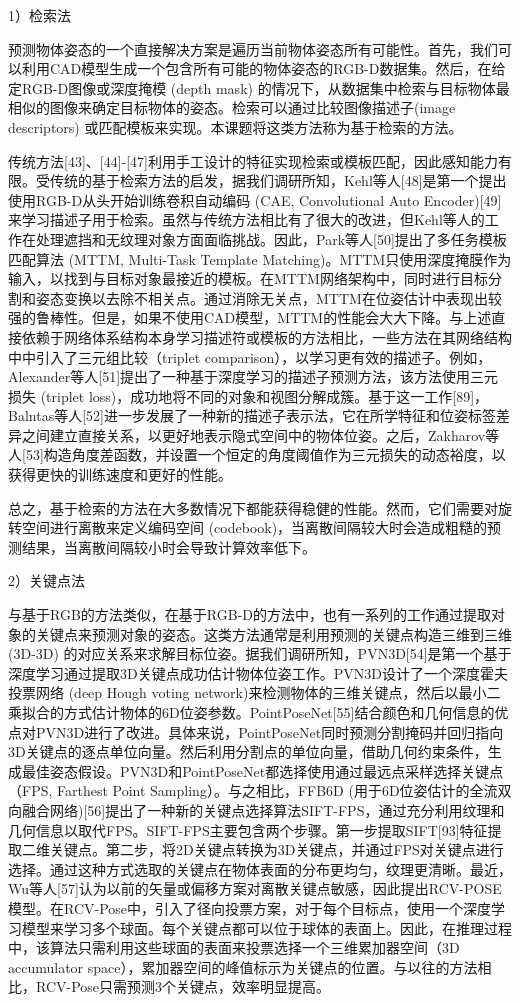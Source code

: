 \documentclass[12pt]{article}
\begin{document}
1）检索法

预测物体姿态的一个直接解决方案是遍历当前物体姿态所有可能性。首先，我们可以利用CAD模型生成一个包含所有可能的物体姿态的RGB-D数据集。然后，在给定RGB-D图像或深度掩模 (depth mask) 的情况下，从数据集中检索与目标物体最相似的图像来确定目标物体的姿态。检索可以通过比较图像描述子(image descriptors) 或匹配模板来实现。本课题将这类方法称为基于检索的方法。

传统方法[43]、[44]-[47]利用手工设计的特征实现检索或模板匹配，因此感知能力有限。受传统的基于检索方法的启发，据我们调研所知，Kehl等人[48]是第一个提出使用RGB-D从头开始训练卷积自动编码 (CAE, Convolutional Auto Encoder)[49]来学习描述子用于检索。虽然与传统方法相比有了很大的改进，但Kehl等人的工作在处理遮挡和无纹理对象方面面临挑战。因此，Park等人[50]提出了多任务模板匹配算法 (MTTM, Multi-Task Template Matching)。MTTM只使用深度掩膜作为输入，以找到与目标对象最接近的模板。在MTTM网络架构中，同时进行目标分割和姿态变换以去除不相关点。通过消除无关点，MTTM在位姿估计中表现出较强的鲁棒性。但是，如果不使用CAD模型，MTTM的性能会大大下降。与上述直接依赖于网络体系结构本身学习描述符或模板的方法相比，一些方法在其网络结构中中引入了三元组比较（triplet comparison），以学习更有效的描述子。例如，Alexander等人[51]提出了一种基于深度学习的描述子预测方法，该方法使用三元损失 (triplet loss)，成功地将不同的对象和视图分解成簇。基于这一工作[89]，Balntas等人[52]进一步发展了一种新的描述子表示法，它在所学特征和位姿标签差异之间建立直接关系，以更好地表示隐式空间中的物体位姿。之后，Zakharov等人[53]构造角度差函数，并设置一个恒定的角度阈值作为三元损失的动态裕度，以获得更快的训练速度和更好的性能。

总之，基于检索的方法在大多数情况下都能获得稳健的性能。然而，它们需要对旋转空间进行离散来定义编码空间 (codebook)，当离散间隔较大时会造成粗糙的预测结果，当离散间隔较小时会导致计算效率低下。

2）关键点法

与基于RGB的方法类似，在基于RGB-D的方法中，也有一系列的工作通过提取对象的关键点来预测对象的姿态。这类方法通常是利用预测的关键点构造三维到三维 (3D-3D) 的对应关系来求解目标位姿。据我们调研所知，PVN3D[54]是第一个基于深度学习通过提取3D关键点成功估计物体位姿工作。PVN3D设计了一个深度霍夫投票网络 (deep Hough voting network)来检测物体的三维关键点，然后以最小二乘拟合的方式估计物体的6D位姿参数。PointPoseNet[55]结合颜色和几何信息的优点对PVN3D进行了改进。具体来说，PointPoseNet同时预测分割掩码并回归指向3D关键点的逐点单位向量。然后利用分割点的单位向量，借助几何约束条件，生成最佳姿态假设。PVN3D和PointPoseNet都选择使用通过最远点采样选择关键点（FPS, Farthest Point Sampling）。与之相比，FFB6D (用于6D位姿估计的全流双向融合网络)[56]提出了一种新的关键点选择算法SIFT-FPS，通过充分利用纹理和几何信息以取代FPS。SIFT-FPS主要包含两个步骤。第一步提取SIFT[93]特征提取二维关键点。第二步，将2D关键点转换为3D关键点，并通过FPS对关键点进行选择。通过这种方式选取的关键点在物体表面的分布更均匀，纹理更清晰。最近，Wu等人[57]认为以前的矢量或偏移方案对离散关键点敏感，因此提出RCV-POSE模型。在RCV-Pose中，引入了径向投票方案，对于每个目标点，使用一个深度学习模型来学习多个球面。每个关键点都可以位于球体的表面上。因此，在推理过程中，该算法只需利用这些球面的表面来投票选择一个三维累加器空间（3D accumulator space），累加器空间的峰值标示为关键点的位置。与以往的方法相比，RCV-Pose只需预测3个关键点，效率明显提高。
\end{document}
